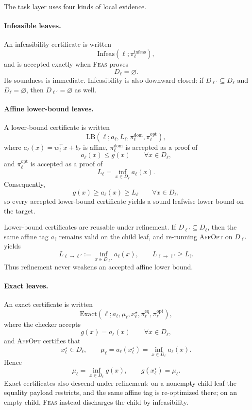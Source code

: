 The task layer uses four kinds of local evidence.

\paragraph{Infeasible leaves.}
An infeasibility certificate is written
\[
\mathrm{Infeas}(\ell;\pi_\ell^{\mathrm{infeas}}),
\]
and is accepted exactly when \textsc{Feas} proves
\[
D_\ell=\varnothing.
\]
Its soundness is immediate. Infeasibility is also downward closed: if $D_{\ell'}\subseteq D_\ell$ and $D_\ell=\varnothing$, then $D_{\ell'}=\varnothing$ as well.

\paragraph{Affine lower-bound leaves.}
A lower-bound certificate is written
\[
\mathrm{LB}(\ell;a_\ell,L_\ell,\pi_\ell^{\mathrm{dom}},\pi_\ell^{\mathrm{opt}}),
\]
where $a_\ell(x)=w_\ell^\top x+b_\ell$ is affine, $\pi_\ell^{\mathrm{dom}}$ is accepted as a proof of
\[
a_\ell(x)\le g(x)
\qquad \forall x\in D_\ell,
\]
and $\pi_\ell^{\mathrm{opt}}$ is accepted as a proof of
\[
L_\ell=\inf_{x\in D_\ell} a_\ell(x).
\]
Consequently,
\[
g(x)\ge a_\ell(x)\ge L_\ell
\qquad \forall x\in D_\ell,
\]
so every accepted lower-bound certificate yields a sound leafwise lower bound on the target.

Lower-bound certificates are reusable under refinement. If $D_{\ell'}\subseteq D_\ell$, then the same affine tag $a_\ell$ remains valid on the child leaf, and re-running \textsc{AffOpt} on $D_{\ell'}$ yields
\[
L_{\ell\to\ell'}:=\inf_{x\in D_{\ell'}} a_\ell(x),
\qquad
L_{\ell\to\ell'}\ge L_\ell.
\]
Thus refinement never weakens an accepted affine lower bound.

\paragraph{Exact leaves.}
An exact certificate is written
\[
\mathrm{Exact}(\ell;a_\ell,\mu_\ell,x_\ell^\star,\pi_\ell^{\mathrm{eq}},\pi_\ell^{\mathrm{opt}}),
\]
where the checker accepts
\[
g(x)=a_\ell(x)
\qquad \forall x\in D_\ell,
\]
and \textsc{AffOpt} certifies that
\[
x_\ell^\star\in D_\ell,
\qquad
\mu_\ell=a_\ell(x_\ell^\star)=\inf_{x\in D_\ell} a_\ell(x).
\]
Hence
\[
\mu_\ell=\inf_{x\in D_\ell} g(x),
\qquad
g(x_\ell^\star)=\mu_\ell.
\]
Exact certificates also descend under refinement: on a nonempty child leaf the equality payload restricts, and the same affine tag is re-optimized there; on an empty child, \textsc{Feas} instead discharges the child by infeasibility.

